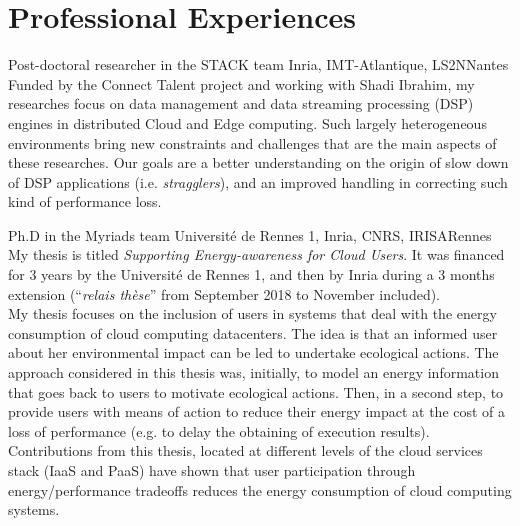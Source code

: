 \documentclass[11pt,a4paper]{moderncv}
\begin{document}
\section{Professional Experiences}
  {Post-doctoral researcher in the STACK team}
  {Inria, IMT-Atlantique, LS2N}{Nantes}{}
  {Funded by the Connect Talent project and working with Shadi Ibrahim, my researches focus on data management and data streaming processing (DSP) engines in distributed Cloud and Edge computing. Such largely heterogeneous environments bring new constraints and challenges that are the main aspects of these researches. Our goals are a better understanding on the origin of slow down of DSP applications (i.e. \textit{stragglers}), and an improved handling in correcting such kind of performance loss.}

  {Ph.D in the Myriads team}
  {Université de Rennes 1, Inria, CNRS, IRISA}{Rennes}{}
  {My thesis is titled \textit{Supporting Energy-awareness for Cloud Users}. It was financed for 3 years by the Université de Rennes 1, and then by Inria during a 3 months extension (``\textit{relais thèse}'' from September 2018 to November included).\\\newline
  My thesis focuses on the inclusion of users in systems that deal with the energy consumption of cloud computing datacenters. The idea is that an informed user about her environmental impact can be led to undertake ecological actions. The approach considered in this thesis was, initially, to model an energy information that goes back to users to motivate ecological actions. Then, in a second step, to provide users with means of action to reduce their energy impact at the cost of a loss of performance (e.g. to delay the obtaining of execution results). Contributions from this thesis, located at different levels of the cloud services stack (IaaS and PaaS) have shown that user participation through energy/performance tradeoffs reduces the energy consumption of cloud computing systems.}
\end{document}
